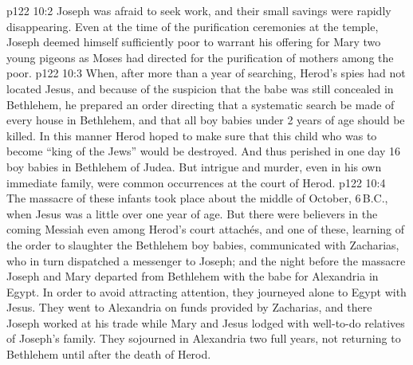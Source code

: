 \vs p122 10:2 Joseph was afraid to seek work, and their small savings were rapidly disappearing. Even at the time of the purification ceremonies at the temple, Joseph deemed himself sufficiently poor to warrant his offering for Mary two young pigeons as Moses had directed for the purification of mothers among the poor.
\vs p122 10:3 When, after more than a year of searching, Herod’s spies had not located Jesus, and because of the suspicion that the babe was still concealed in Bethlehem, he prepared an order directing that a systematic search be made of every house in Bethlehem, and that all boy babies under 2 years of age should be killed. In this manner Herod hoped to make sure that this child who was to become “king of the Jews” would be destroyed. And thus perished in one day 16 boy babies in Bethlehem of Judea. But intrigue and murder, even in his own immediate family, were common occurrences at the court of Herod.
\vs p122 10:4 The massacre of these infants took place about the middle of October, 6\,B.C., when Jesus was a little over one year of age. But there were believers in the coming Messiah even among Herod’s court attachés, and one of these, learning of the order to slaughter the Bethlehem boy babies, communicated with Zacharias, who in turn dispatched a messenger to Joseph; and the night before the massacre Joseph and Mary departed from Bethlehem with the babe for Alexandria in Egypt. In order to avoid attracting attention, they journeyed alone to Egypt with Jesus. They went to Alexandria on funds provided by Zacharias, and there Joseph worked at his trade while Mary and Jesus lodged with well\hyp{}to\hyp{}do relatives of Joseph’s family. They sojourned in Alexandria two full years, not returning to Bethlehem until after the death of Herod.
\quizlink
